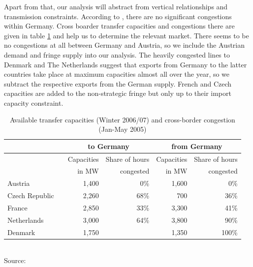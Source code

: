 Apart from that, our analysis will abstract from vertical relationships and transmission constraints. According to \cite{IEA2007a}, there are no significant congestions within Germany. Cross boarder transfer capacities and congestions there are given in table \ref{tab:transfer} and help us to determine the relevant market. There seems to be no congestions at all between Germany and Austria, so we include the Austrian demand and fringe supply into our analysis. The heavily congested lines to Denmark and The Netherlands suggest that exports from Germany to the latter countries take place at maximum capacities almost all over the year, so we subtract the respective exports from the German supply. French and Czech capacities are added to the non-strategic fringe but only up to their import capacity constraint.

\begin{table}[htb]
\centering
\small
\caption{Available transfer capacities (Winter 2006/07) and cross-border congestion (Jan-May 2005)}
\vspace{0.3cm}
\begin{tabular}{lrrrrr}
\hline
           &            & \multicolumn{ 2}{c}{to Germany} & \multicolumn{ 2}{c}{from Germany} \\
\hline
           &            & Capacities  & Share of hours  & Capacities & Share of hours  \\

           &            & in MW        &  congested & in MW           &  congested \\
\hline
\hline
   Austria &            &       1,400 &        0\% &       1,600 &        0\% \\

Czech Republic &            &       2,260 &       68\% &        700 &       36\% \\

    France &            &       2,850 &       33\% &       3,300 &       41\% \\

Netherlands &            &       3,000 &       64\% &       3,800 &       90\% \\

   Denmark &            &       1,750 &            &       1,350 &      100\% \\

\hline
\end{tabular}  
\label{tab:transfer}
\\
\vspace{0.3cm}
\scriptsize Source: \cite{IEA2007a}
\end{table}

